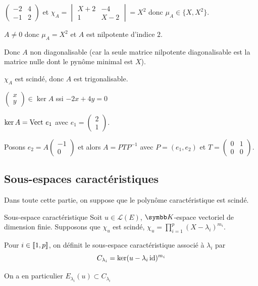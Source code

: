 \begin{exemple}
    $\begin{pmatrix}
        -2 & 4 \\ 
        -1 & 2
    \end{pmatrix}$ et $\chi_A = \begin{vmatrix}
        X + 2 & -4 \\
        1 & X - 2
    \end{vmatrix} = X^2$ donc $\mu_A \in \{X, X^2\}$.

    $A \neq 0$ donc $\mu_A = X^2$ et $A$ est nilpotente d'indice $2$.

    Donc $A$ non diagonalisable (car la seule matrice nilpotente diagonalisable 
    est la matrice nulle dont le pynôme minimal est $X$).

    $\chi_A$ est scindé, donc $A$ est trigonalisable. 

    $\begin{pmatrix}
        x \\ y
    \end{pmatrix} \in \ker A$ ssi $-2x + 4y = 0$

    $\ker A = \operatorname{Vect} \, e_1$ avec $e_1 = \begin{pmatrix}
        2 \\ 1
    \end{pmatrix}$.

    Posons $e_2 = A \begin{pmatrix}
        -1 \\ 0
    \end{pmatrix}$ et alors $A = PTP^{-1}$ avec $P = (e_1, e_2)$ et 
    $T = \begin{pmatrix}
        0 & 1 \\
        0 & 0
    \end{pmatrix}$.
\end{exemple}


\subsection{Sous-espaces caractéristiques}

Dans toute cette partie, on suppose que le polynôme caractéristique est scindé.

\begin{definition}{Sous-espace caractéristique}{}
    Soit $u \in \mathscr L(E)$, $\K$-espace vectoriel de dimension finie. Supposons
    que $\chi_u$ est scindé, $\displaystyle \chi_u = \prod_{i = 1 }^{ p } (X - \lambda_i)^{m_i}$.

    \lvspace \avspace 

    Pour $i \in [\![1, p]\!]$, on définit le sous-espace caractéristique associé à $\lambda_i$ par 
    $$C_{\lambda_i} = \ker (u - \lambda_i \operatorname{id} )^{m_i}$$

    On a en particulier $E_{\lambda_i}(u) \subset C_{\lambda_i} $
\end{definition}

